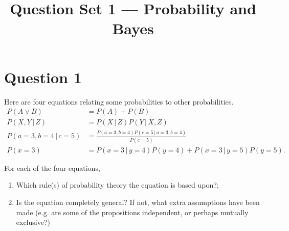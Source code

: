 \documentclass[a4paper, 12pt]{article}
\title{Question Set 1 --- Probability and Bayes}
\author{}
\date{}
\newcommand{\given}{\,|\,}
\begin{document}
\maketitle


\setlength{\parindent}{0pt}
\setlength{\parskip}{8pt}

\section*{Question 1}
Here are four equations relating some probabilities to other probabilities.
\begin{align}
P(A \vee B) &= P(A) + P(B) \\
P(X, Y \given Z) &= P(X \given Z)P(Y \given X, Z) \\
P(a=3, b=4 \given c=5) &= \frac{P(a=3, b=4)P(c = 5 \given a=3, b=4)}
                          {P(c=5)} \\
P(x=3) &= P(x=3 \given y=4)P(y=4) + P(x=3 \given y=5)P(y=5).
\end{align}

For each of the four equations,
\begin{enumerate}
\item Which rule(s) of probability theory the equation is based upon?;
\item Is the equation completely general? If not,
what extra assumptions have been made (e.g. are some of the
propositions independent, or perhaps mutually exclusive?)
\end{enumerate}
\end{document}
